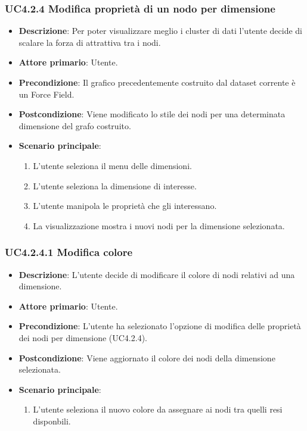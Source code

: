 \subsubsection{UC4.2.4 Modifica proprietà di un nodo per dimensione}
\label{subsec:uc4.2.4}
\begin{itemize}
    \item \textbf{Descrizione}: Per poter visualizzare meglio i cluster di dati l’utente 
                                decide di scalare la forza di attrattiva tra i nodi.

	
    \item \textbf{Attore primario}: Utente.
    
    \item \textbf{Precondizione}:   Il grafico precedentemente costruito dal dataset corrente è un Force Field.

    \item \textbf{Postcondizione}:  Viene modificato lo stile dei nodi per una determinata dimensione del grafo costruito.

	\item \textbf{Scenario principale}:
        \begin{enumerate}
        
            \item L'utente seleziona il menu delle dimensioni.
            \item L'utente seleziona la dimensione di interesse.
            \item L'utente manipola le proprietà che gli interessano.
            \item La visualizzazione mostra i nuovi nodi per la dimensione selezionata.
                
        \end{enumerate}
\end{itemize}


\subsubsection{UC4.2.4.1 Modifica colore}
\label{subsec:uc4.2.4.1}
\begin{itemize}
    \item \textbf{Descrizione}: L'utente decide di modificare il colore di nodi relativi ad una dimensione.

	
    \item \textbf{Attore primario}: Utente.
    
    \item \textbf{Precondizione}:   L'utente ha selezionato l'opzione di modifica delle proprietà dei nodi per dimensione (UC4.2.4).
    \item \textbf{Postcondizione}:  Viene aggiornato il colore dei nodi della dimensione selezionata.

	\item \textbf{Scenario principale}:
        \begin{enumerate}
            \item L'utente seleziona il nuovo colore da assegnare ai nodi tra quelli resi disponbili.
        \end{enumerate}
\end{itemize}

